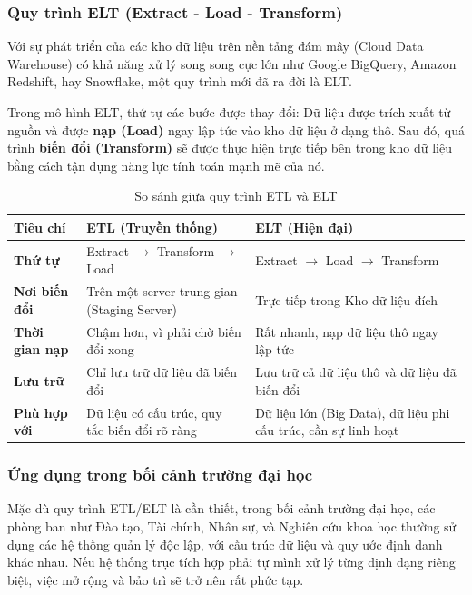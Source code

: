 \subsubsection{Quy trình ELT (Extract - Load - Transform)}
Với sự phát triển của các kho dữ liệu trên nền tảng đám mây (Cloud Data Warehouse) có khả năng xử lý song song cực lớn như Google BigQuery, Amazon Redshift, hay Snowflake, một quy trình mới đã ra đời là ELT.

Trong mô hình ELT, thứ tự các bước được thay đổi: Dữ liệu được trích xuất từ nguồn và được \textbf{nạp (Load)} ngay lập tức vào kho dữ liệu ở dạng thô. Sau đó, quá trình \textbf{biến đổi (Transform)} sẽ được thực hiện trực tiếp bên trong kho dữ liệu bằng cách tận dụng năng lực tính toán mạnh mẽ của nó.

\begin{table}[h!]
    \centering
    \begin{tabular}{|l|p{5.5cm}|p{5.5cm}|}
        \hline
        \textbf{Tiêu chí} & \textbf{ETL (Truyền thống)} & \textbf{ELT (Hiện đại)} \\
        \hline
        \textbf{Thứ tự} & Extract \(\rightarrow\) Transform \(\rightarrow\) Load & Extract \(\rightarrow\) Load \(\rightarrow\) Transform \\
        \hline
        \textbf{Nơi biến đổi} & Trên một server trung gian (Staging Server) & Trực tiếp trong Kho dữ liệu đích \\
        \hline
        \textbf{Thời gian nạp} & Chậm hơn, vì phải chờ biến đổi xong & Rất nhanh, nạp dữ liệu thô ngay lập tức \\
        \hline
        \textbf{Lưu trữ} & Chỉ lưu trữ dữ liệu đã biến đổi & Lưu trữ cả dữ liệu thô và dữ liệu đã biến đổi \\
        \hline
        \textbf{Phù hợp với} & Dữ liệu có cấu trúc, quy tắc biến đổi rõ ràng & Dữ liệu lớn (Big Data), dữ liệu phi cấu trúc, cần sự linh hoạt \\
        \hline
    \end{tabular}
    \caption{So sánh giữa quy trình ETL và ELT}
    \label{tab:etl_vs_elt}
\end{table}

\subsubsection{Ứng dụng trong bối cảnh trường đại học}

Mặc dù quy trình ETL/ELT là cần thiết, trong bối cảnh trường đại học, các phòng ban như Đào tạo, Tài chính, Nhân sự, và Nghiên cứu khoa học thường sử dụng các hệ thống quản lý độc lập, với cấu trúc dữ liệu và quy ước định danh khác nhau. Nếu hệ thống trục tích hợp phải tự mình xử lý từng định dạng riêng biệt, việc mở rộng và bảo trì sẽ trở nên rất phức tạp.

